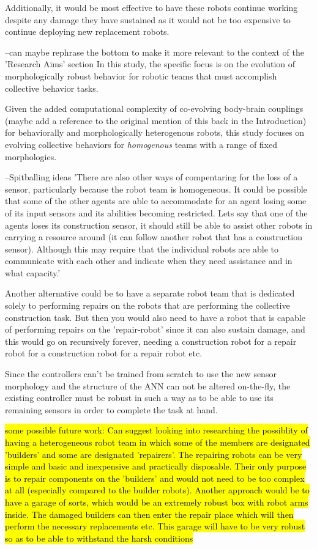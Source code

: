 Additionally, it would be most effective to have these robots continue working despite any damage they have sustained as it would not be too expensive to continue deploying new replacement robots.

--can maybe rephrase the bottom to make it more relevant to the context of the 'Research Aims' section
In this study, the specific focus is on the evolution of morphologically robust behavior
for robotic teams that must accomplish collective behavior tasks.

Given the added computational complexity of co-evolving body-brain couplings (maybe add a reference to the original mention of this back in the Introduction)
for behaviorally and morphologically heterogenous robots,
this study focuses on evolving collective behaviors for \textit{homogenous} teams with a range of fixed morphologies.



--Spitballing ideas
'There are also other ways of compentaring for the loss of a sensor, particularly because the robot team is homogeneous. It could be possible that some of the other agents are able to accommodate for an agent losing some of its input sensors and its abilities becoming restricted. Lets say that one of the agents loses its construction sensor, it should still be able to assist other robots in carrying a resource around (it can follow another robot that has a construction sensor). Although this may require that the individual robots are able to communicate with each other and indicate when they need assistance and in what capacity.'

Another alternative could be to have a separate robot team that is dedicated solely to performing repairs on the robots that are performing the collective construction task. But then you would also need to have a robot that is capable of performing repairs on the 'repair-robot' since it can also sustain damage, and this would go on recursively forever, needing a construction robot for a repair robot for a construction robot for a repair robot etc.

Since the controllers can't be trained from scratch to use the new sensor morphology and the structure of the ANN can not be altered on-the-fly, the existing controller must be robust in such a way as to be able to use its remaining sensors in order to complete the task at hand.

\hl{some possible future work: Can suggest looking into researching the possiblity of having a heterogeneous robot team in which some of the members are designated 'builders' and some are designated 'repairers'. The repairing robots can be very simple and basic and inexpensive and practically disposable. Their only purpose is to repair components on the 'builders' and would not need to be too complex at all (especially compared to the builder robots). Another approach would be to have a garage of sorts, which would be an extremely robust box with robot arms inside. The damaged builders can then enter the repair place which will then perform the necessary replacements etc. This garage will have to be very robust so as to be able to withstand the harsh conditions}

